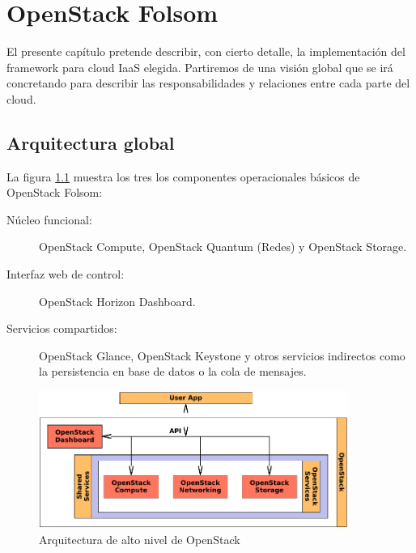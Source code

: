 \chapter{OpenStack Folsom}\label{cap:openstack}
\noindent El presente cap\'itulo pretende describir, con cierto detalle, la implementaci\'on del framework para cloud IaaS elegida. Partiremos de una visi\'on global que se ir\'a concretando para describir las responsabilidades y relaciones entre cada parte del cloud.

\section{Arquitectura global}\label{sec:arquitecturaglobal}
\noindent La figura \ref{fig:arquitecturaos} muestra los tres los componentes operacionales b\'asicos de OpenStack Folsom:

\begin{description}
 \item[N\'ucleo funcional:] OpenStack Compute, OpenStack Quantum (Redes) y OpenStack Storage.
 \item[Interfaz web de control:] OpenStack Horizon Dashboard.
 \item[Servicios compartidos:] OpenStack Glance, OpenStack Keystone y otros servicios indirectos como la persistencia en base de datos o la cola de mensajes.
\end{description}

\begin{figure}[tbp]
\begin{center}
\includegraphics[width=0.9\textwidth]{imagenes/012.pdf}
 \caption{Arquitectura de alto nivel de OpenStack}
\label{fig:arquitecturaos}
\end{center}
\end{figure}


